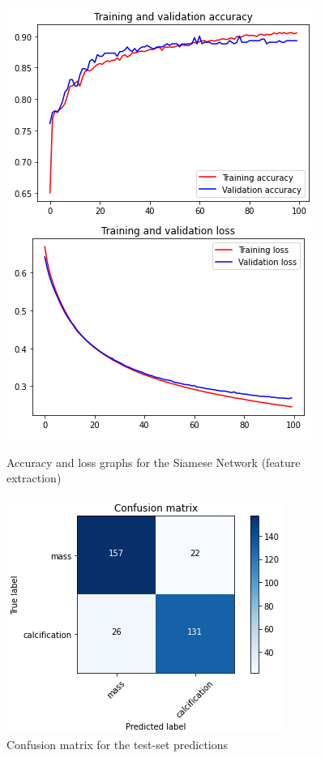 \documentclass[11pt,a4paper,oneside]{article}
\begin{document}
\begin{figure}[h]
\centering
	\begin{minipage}[c]{.4\textwidth}
		\centering\setlength{\captionmargin}{0pt}%
		\includegraphics[width=.9\textwidth]{images/4.1/Siamese/Accuracy_fe}
		\caption{Accuracy and loss graphs for the Siamese Network (feature extraction)}
		\label{fig:scratch_accuracy}
	\end{minipage}
	\hspace{5mm}%
	\begin{minipage}[c]{.4\textwidth}
		\centering\setlength{\captionmargin}{0pt}%
		\includegraphics[width=.9\textwidth]{images/4.1/Siamese/Conf_Matrix_fe}
		\caption{Confusion matrix for the test-set predictions}
		\label{fig:scratch_matrix}
	\end{minipage}%
\end{figure}
\end{document}
